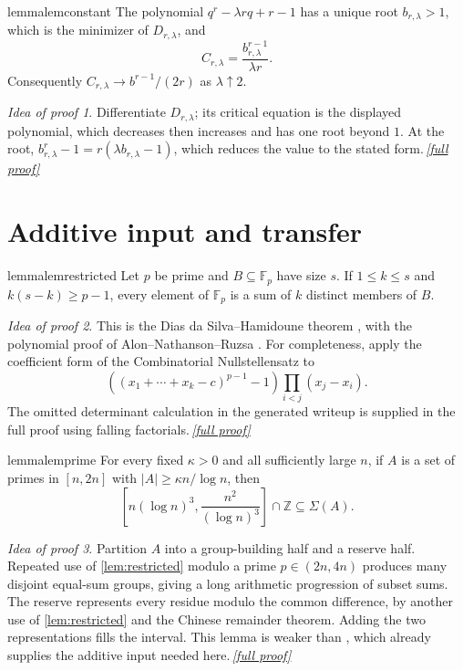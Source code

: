 \documentclass[11pt,a4paper]{article}
\theoremstyle{plain}
\theoremstyle{definition}
\theoremstyle{remark}
\newtheorem*{proofidea}{Idea of proof}
\newcommand{\fullproofref}[1]{\,\hyperref[#1]{\textit{[full proof]}}}
\newcommand{\F}{\mathbb F}
\begin{document}
\begin{restatable}{lemma}{lemconstant}\label{lem:constant}
The polynomial $q^r-\lambda rq+r-1$ has a unique root
$b_{r,\lambda}>1$, which is the minimizer of $D_{r,\lambda}$, and
\[
 C_{r,\lambda}=\frac{b_{r,\lambda}^{r-1}}{\lambda r}.
\]
Consequently $C_{r,\lambda}\to b^{r-1}/(2r)$ as $\lambda\uparrow2$.
\end{restatable}
\begin{proofidea}
Differentiate $D_{r,\lambda}$; its critical equation is the displayed
polynomial, which decreases then increases and has one root beyond
$1$. At the root, $b_{r,\lambda}^r-1
=r(\lambda b_{r,\lambda}-1)$, which reduces the value to the stated
form.\fullproofref{pf:constant}
\end{proofidea}

\section{Additive input and transfer}
\begin{restatable}{lemma}{lemrestricted}\label{lem:restricted}
Let $p$ be prime and $B\subseteq\F_p$ have size $s$. If
$1\le k\le s$ and $k(s-k)\ge p-1$, every element of $\F_p$ is a sum of
$k$ distinct members of $B$.
\end{restatable}
\begin{proofidea}
This is the Dias da Silva--Hamidoune theorem
\cite{DH94}, with the polynomial proof of Alon--Nathanson--Ruzsa
\cite{ANR96}. For completeness, apply the coefficient form of the
Combinatorial Nullstellensatz to
\[
 ((x_1+\cdots+x_k-c)^{p-1}-1)\prod_{i<j}(x_j-x_i).
\]
The omitted determinant calculation in the generated writeup is supplied
in the full proof using falling factorials.\fullproofref{pf:restricted}
\end{proofidea}

\begin{restatable}{lemma}{lemprime}\label{lem:prime}
For every fixed $\kappa>0$ and all sufficiently large $n$, if $A$ is a
set of primes in $[n,2n]$ with $|A|\ge\kappa n/\log n$, then
\[
 \left[n(\log n)^3,\frac{n^2}{(\log n)^3}\right]\cap\mathbb Z
 \subseteq\Sigma(A).
\]
\end{restatable}
\begin{proofidea}
Partition $A$ into a group-building half and a reserve half. Repeated use
of \cref{lem:restricted} modulo a prime $p\in(2n,4n)$ produces many
disjoint equal-sum groups, giving a long arithmetic progression of
subset sums. The reserve represents every residue modulo the common
difference, by another use of \cref{lem:restricted} and the Chinese
remainder theorem. Adding the two representations fills the interval.
This lemma is weaker than \cite[Lemma~2]{CFP22}, which already supplies
the additive input needed here.\fullproofref{pf:prime}
\end{proofidea}
\end{document}
